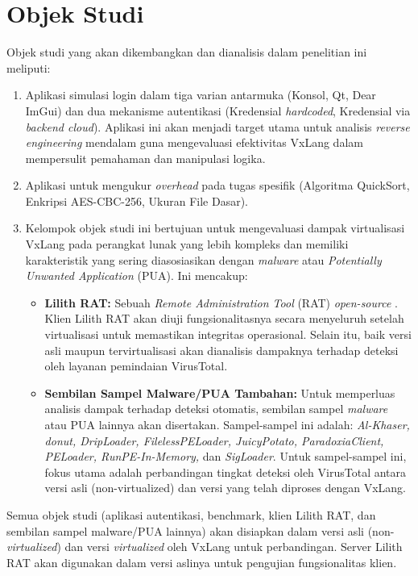 \section{Objek Studi}
Objek studi yang akan dikembangkan dan dianalisis dalam penelitian ini meliputi:
\begin{enumerate}
    \item {} Aplikasi simulasi login dalam tiga varian antarmuka (Konsol, Qt, Dear ImGui) dan dua mekanisme autentikasi (Kredensial \textit{hardcoded}, Kredensial via \textit{backend cloud}). Aplikasi ini akan menjadi target utama untuk analisis \textit{reverse engineering} mendalam guna mengevaluasi efektivitas VxLang dalam mempersulit pemahaman dan manipulasi logika.
    \item {} Aplikasi untuk mengukur \textit{overhead} pada tugas spesifik (Algoritma QuickSort, Enkripsi AES-CBC-256, Ukuran File Dasar).
    \item {} 
    Kelompok objek studi ini bertujuan untuk mengevaluasi dampak virtualisasi VxLang pada perangkat lunak yang lebih kompleks dan memiliki karakteristik yang sering diasosiasikan dengan \textit{malware} atau \textit{Potentially Unwanted Application} (PUA). Ini mencakup:
        \begin{itemize}
            \item \textbf{Lilith RAT:} Sebuah \textit{Remote Administration Tool} (RAT) \textit{open-source} \cite{LilithRAT}. Klien Lilith RAT akan diuji fungsionalitasnya secara menyeluruh setelah virtualisasi untuk memastikan integritas operasional. Selain itu, baik versi asli maupun tervirtualisasi akan dianalisis dampaknya terhadap deteksi oleh layanan pemindaian VirusTotal.
            \item \textbf{Sembilan Sampel Malware/PUA Tambahan:} Untuk memperluas analisis dampak terhadap deteksi otomatis, sembilan sampel \textit{malware} atau PUA lainnya akan disertakan. Sampel-sampel ini adalah: \textit{Al-Khaser, donut, DripLoader, FilelessPELoader, JuicyPotato, ParadoxiaClient, PELoader, RunPE-In-Memory,} dan \textit{SigLoader}. Untuk sampel-sampel ini, fokus utama adalah perbandingan tingkat deteksi oleh VirusTotal antara versi asli (non-virtualized) dan versi yang telah diproses dengan VxLang.
        \end{itemize}
\end{enumerate}
Semua objek studi (aplikasi autentikasi, benchmark, klien Lilith RAT, dan sembilan sampel malware/PUA lainnya) akan disiapkan dalam versi asli (non-\textit{virtualized}) dan versi \textit{virtualized} oleh VxLang untuk perbandingan. Server Lilith RAT akan digunakan dalam versi aslinya untuk pengujian fungsionalitas klien.

